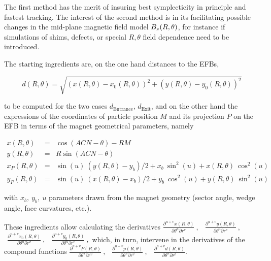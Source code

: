 \noindent The first method has the merit of insuring best symplecticity in principle and fastest tracking. 
The interest of the second method is in its  facilitating possible  changes in 
  the mid-plane magnetic field model ${B_z}(R,\theta)$, for instance if simulations of shims, defects, 
or special $R, \theta$  field dependence need to be introduced. 



\bigskip


\bigskip

\noindent The  starting ingredients are, on the one hand distances to the EFBs,  

$$d(R,\theta)=\sqrt{(x(R,\theta)-x_{0}(R,\theta))^2+(y(R,\theta)-y_{0}(R,\theta))^2}$$

\noindent to be computed for the two cases $d_{\textrm{Entrance}}$, $d_{\textrm{Exit}}$, and 
on the other hand the expressions of the coordinates of particle position $M$ and its projection $P$ on 
the EFB in terms of the magnet geometrical parameters, namely 

\begin{eqnarray}
x(R,\theta)&=&\cos (ACN-\theta)-RM   \nonumber \\[-1ex]
y(R,\theta)&=&R\sin (ACN-\theta)   \nonumber \\[-1ex]
x_P(R,\theta)&=&\sin(u)\:  (y(R,\theta) - y_b)/2 + x_b\:  \sin^2(u) + x(R,\theta)\:  \cos^2(u)   \nonumber \\[-1ex]
y_P(R,\theta)&=&\sin(u)\: (x(R,\theta) - x_b)/2 + y_b\:  \cos^2(u) + y(R,\theta) \: \sin^2(u)   \nonumber 
\end{eqnarray}

\noindent with $x_b,~y_b,~u$ parameters drawn from the  magnet geometry (sector angle, wedge angle, face curvatures, etc.). 

\noindent These ingredients allow calculating  the derivatives 
$\frac{\partial^{ u+v}x(R,\theta)}{ \partial \theta^u\partial r^v}\:,$ 
$\:\: \frac{\partial^{ u+v}y(R,\theta)}{ \partial \theta^u\partial r^v}\:,$ 
$\:\:\frac{\partial^{ u+v}x_0(R,\theta)}{ \partial \theta^u\partial r^v}\:,$ 
$\:\:\frac{\partial^{ u+v}y_0(R,\theta)}{ \partial \theta^u\partial r^v}\:,$ 
which, in turn,  intervene in the derivatives of the compound functions 
$\frac{\partial^{ u+v}F(R,\theta)}{ \partial \theta^u\partial r^v}\:,$ 
$\:\:\frac{\partial^{ u+v}p(R,\theta)}{ \partial \theta^u\partial r^v}\:,$ 
$\:\:\frac{\partial^{ u+v}d(R,\theta)}{ \partial \theta^u\partial r^v}$. 


